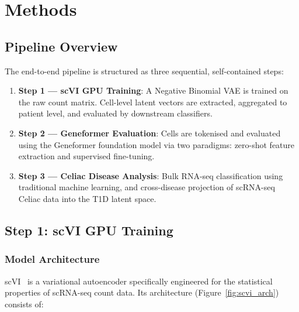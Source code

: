 \chapter{Methods}
\label{chap:methods}

\section{Pipeline Overview}

The end-to-end pipeline is structured as three sequential, self-contained steps:

\begin{enumerate}
    \item \textbf{Step 1 --- scVI GPU Training}: A Negative Binomial VAE is trained on the raw count matrix. Cell-level latent vectors are extracted, aggregated to patient level, and evaluated by downstream classifiers.
    \item \textbf{Step 2 --- Geneformer Evaluation}: Cells are tokenised and evaluated using the Geneformer foundation model via two paradigms: zero-shot feature extraction and supervised fine-tuning.
    \item \textbf{Step 3 --- Celiac Disease Analysis}: Bulk RNA-seq classification using traditional machine learning, and cross-disease projection of scRNA-seq Celiac data into the T1D latent space.
\end{enumerate}

\section{Step 1: scVI GPU Training}

\subsection{Model Architecture}

scVI~\cite{lopez2018deep} is a variational autoencoder specifically engineered for the statistical properties of scRNA-seq count data. Its architecture (Figure~\ref{fig:scvi_arch}) consists of:

